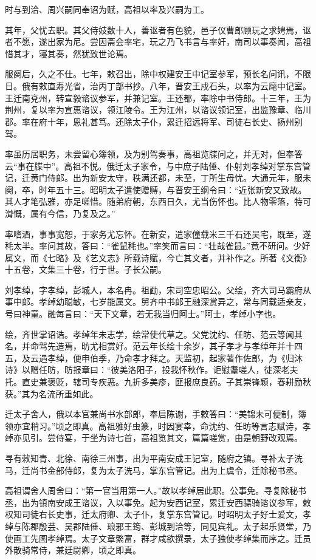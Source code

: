 \documentclass[12pt,UTF8]{ctexbook}
\begin{document}
时与到洽、周兴嗣同奉诏为赋，高祖以率及兴嗣为工。

其年，父忧去职。其父侍妓数十人，善讴者有色貌，邑子仪曹郎顾玩之求娉焉，讴者不愿，遂出家为尼。尝因斋会率宅，玩之乃飞书言与率奸，南司以事奏闻，高祖惜其才，寝其奏，然犹致世论焉。

服阕后，久之不仕。七年，敕召出，除中权建安王中记室参军，预长名问讯，不限日。俄有敕直寿光省，治丙丁部书抄。八年，晋安王戍石头，以率为云麾中记室。王迁南兗州，转宣毅谘议参军，并兼记室。王还都，率除中书侍郎。十三年，王为荆州，复以率为宣惠谘议，领江陵令。王为江州，以谘议领记室，出监豫章、临川郡。率在府十年，恩礼甚笃。还除太子仆，累迁招远将军、司徒右长史、扬州别驾。

率虽历居职务，未尝留心簿领，及为别驾奏事，高祖览牒问之，并无对，但奉答云“事在牒中”。高祖不悦。俄迁太子家令，与中庶子陆倕、仆射刘孝绰对掌东宫管记，迁黄门侍郎。出为新安太守，秩满还都，未至，丁所生母忧。大通元年，服未阕，卒，时年五十三。昭明太子遣使赠赙，与晋安王纲令曰：“近张新安又致故。其人才笔弘雅，亦足嗟惜。随弟府朝，东西日久，尤当伤怀也。比人物零落，特可潸慨，属有今信，乃复及之。”

率嗜酒，事事宽恕，于家务尤忘怀。在新安，遣家僮载米三千石还吴宅，既至，遂秏太半。率问其故，答曰：“雀鼠秏也。”率笑而言曰：“壮哉雀鼠。”竟不研问。少好属文，而《七略》及《艺文志》所载诗赋，今亡其文者，并补作之。所著《文衡》十五卷，文集三十卷，行于世。子长公嗣。

刘孝绰，字孝绰，彭城人，本名冉。祖勔，宋司空忠昭公。父绘，齐大司马霸府从事中郎。孝绰幼聪敏，七岁能属文。舅齐中书郎王融深赏异之，常与同载适亲友，号曰神童。融每言曰：“天下文章，若无我当归阿士。”阿士，孝绰小字也。

绘，齐世掌诏诰。孝绰年未志学，绘常使代草之。父党沈约、任昉、范云等闻其名，并命驾先造焉，昉尤相赏好。范云年长绘十余岁，其子孝才与孝绰年并十四五，及云遇孝绰，便申伯季，乃命孝才拜之。天监初，起家著作佐郎，为《归沐诗》以赠任昉，昉报章曰：“彼美洛阳子，投我怀秋作。讵慰耋嗟人，徒深老夫托。直史兼褒贬，辖司专疾恶。九折多美疹，匪报庶良药。子其崇锋颖，春耕励秋获。”其为名流所重如此。

迁太子舍人，俄以本官兼尚书水部郎，奉启陈谢，手敕答曰：“美锦未可便制，簿领亦宜稍习。”顷之即真。高祖雅好虫篆，时因宴幸，命沈约、任昉等言志赋诗，孝绰亦见引。尝侍宴，于坐为诗七首，高祖览其文，篇篇嗟赏，由是朝野改观焉。

寻有敕知青、北徐、南徐三州事，出为平南安成王记室，随府之镇。寻补太子洗马，迁尚书金部侍郎，复为太子洗马，掌东宫管记。出为上虞令，迁除秘书丞。

高祖谓舍人周舍曰：“第一官当用第一人。”故以孝绰居此职。公事免。寻复除秘书丞，出为镇南安成王谘议，入以事免。起为安西记室，累迁安西骠骑谘议参军，敕权知司徒右长史事，迁太府卿、太子仆，复掌东宫管记。时昭明太子好士爱文，孝绰与陈郡殷芸、吴郡陆倕、琅邪王筠、彭城到洽等，同见宾礼。太子起乐贤堂，乃使画工先图孝绰焉。太子文章繁富，群才咸欲撰录，太子独使孝绰集而序之。迁员外散骑常侍，兼廷尉卿，顷之即真。
\end{document}
